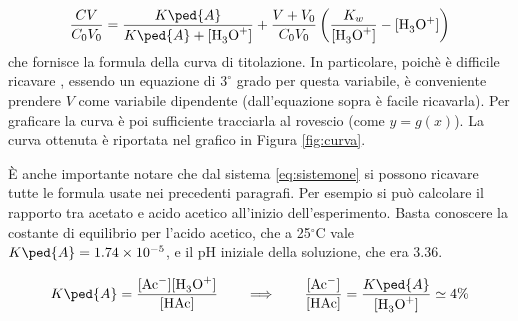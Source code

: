 \begin{equation}
    \frac{CV}{C_0V_0} = \frac{K\ped{A}}{K\ped{A} + \ce{[H3O+]}} + \frac{V + V_0}{C_0V_0} \left(\frac{K_w}{\ce{[H3O+]}} - \ce{[H3O+]} \right)
    \label{eq:curv}
\end{equation}
%
che fornisce la formula della curva di titolazione. In particolare, poichè è difficile ricavare \ce{[H3O+]}, essendo
un equazione di $3^\circ$ grado per questa variabile, è conveniente prendere $V$ come variabile dipendente 
(dall'equazione sopra è facile ricavarla). Per graficare la curva è poi sufficiente tracciarla al rovescio (come $y = g(x)$).
La curva ottenuta è riportata nel grafico in Figura \ref{fig:curva}.

È anche importante notare che dal sistema \eqref{eq:sistemone} si possono ricavare tutte le formula usate nei precedenti paragrafi. Per esempio si può calcolare il rapporto tra acetato e acido acetico all'inizio dell'esperimento. Basta conoscere la costante di equilibrio per l'acido acetico, che a 25$^\circ$C vale
$K\ped{A} = 1.74 \times 10^{-5}$, e il pH iniziale della soluzione, che era 3.36.

\begin{equation}
    K\ped{A} = \frac{[\ce{Ac-}][\ce{H3O+}]}{[\ce{HAc}]} \qquad
    \Longrightarrow \qquad \frac{[\ce{Ac-}]}{[\ce{HAc}]} = \frac{K\ped{A}}{[\ce{H3O+}]} \simeq 4\%
    \label{eq:massa}
\end{equation}
